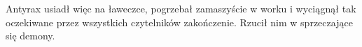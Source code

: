 Antyrax usiadł więc na ławeczce, pogrzebał zamaszyście w worku i wyciągnął tak oczekiwane przez wszystkich czytelników zakończenie.
Rzucił nim w sprzeczające się demony.
\divider{}





































